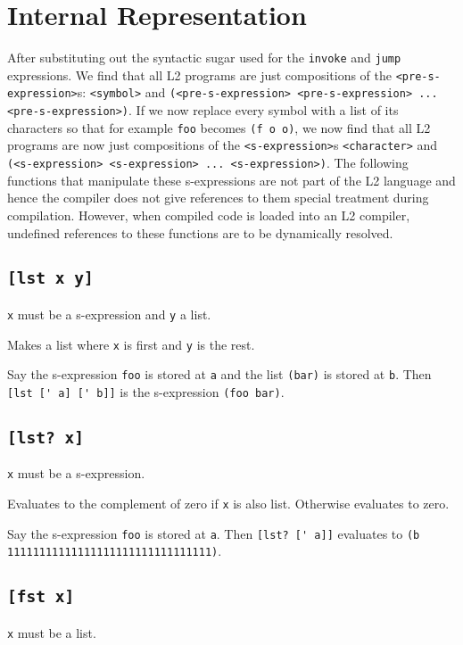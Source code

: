 \documentclass[twocolumn,landscape]{article}
\begin{document}
  \section{Internal Representation}\label{sec:internal-representation}
    After substituting out the syntactic sugar used for the \lstinline{invoke} and \lstinline{jump} expressions. We find that all L2 programs are just compositions of the \lstinline{<pre-s-expression>}s: \lstinline{<symbol>} and \lstinline{(<pre-s-expression> <pre-s-expression> ... <pre-s-expression>)}. If we now replace every symbol with a list of its characters so that for example \lstinline{foo} becomes \lstinline{(f o o)}, we now find that all L2 programs are now just compositions of the \lstinline{<s-expression>}s \lstinline{<character>} and \lstinline{(<s-expression> <s-expression> ... <s-expression>)}. The following functions that manipulate these s-expressions are not part of the L2 language and hence the compiler does not give references to them special treatment during compilation. However, when compiled code is loaded into an L2 compiler, undefined references to these functions are to be dynamically resolved.

    \subsection{\lstinline{[lst x y]}}
      \lstinline{x} must be a s-expression and \lstinline{y} a list.

      Makes a list where \lstinline{x} is first and \lstinline{y} is the rest.

      Say the s-expression \lstinline{foo} is stored at \lstinline{a} and the list \lstinline{(bar)} is stored at \lstinline{b}. Then \lstinline{[lst [' a] [' b]]} is the s-expression \lstinline{(foo bar)}.
    \subsection{\lstinline{[lst? x]}}
      \lstinline{x} must be a s-expression.

      Evaluates to the complement of zero if \lstinline{x} is also list. Otherwise evaluates to zero.

      Say the s-expression \lstinline{foo} is stored at \lstinline{a}. Then \lstinline{[lst? [' a]]} evaluates to \lstinline{(b 11111111111111111111111111111111)}.
    \subsection{\lstinline{[fst x]}}
      \lstinline{x} must be a list.
\end{document}
